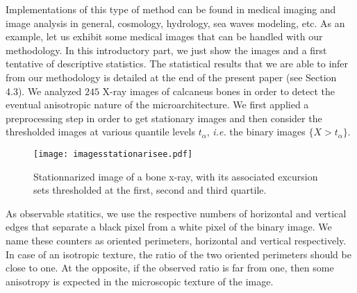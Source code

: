 \documentclass[12pt]{article}
\theoremstyle{Theorem}
\theoremstyle{definition}
\begin{document}
Implementations of this type of method can be found in medical imaging and image analysis in general, cosmology, hydrology, sea waves modeling, etc. As an example, let us exhibit some medical images that can be handled with our methodology. In this introductory part, we just show the images and a first tentative of descriptive statistics. The statistical results that we are able to infer from our methodology is detailed at the end of the present paper (see Section 4.3). 
We analyzed $245$ X-ray images of calcaneus bones in order to detect the eventual anisotropic nature of the microarchitecture.
We first applied a preprocessing step in order to get stationary images 
and then 
consider the thresholded images at various quantile levels $t_{\alpha}$, \emph{i.e.} the binary images $\{X > t_{\alpha}\}$.
\begin{figure}[H]
\centering
{\texttt{[image: imagesstationarisee.pdf]}}
 \caption{Stationnarized image of a bone x-ray, with its associated excursion sets thresholded at the first, second and third quartile.}
\label{fig22}
\end{figure}
As observable statitics, we use 
the respective numbers of horizontal and vertical edges that separate a black pixel from a white pixel of the binary image. We name these counters as oriented perimeters, horizontal and vertical respectively. In case of an isotropic texture, the ratio of the two oriented perimeters should be close to one. At the opposite, if the observed ratio is far from one, then some anisotropy is expected in the microscopic texture of the image. 
\end{document}

